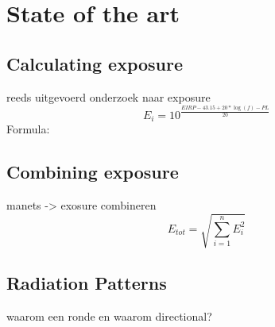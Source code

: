 \chapter{State of the art}
\label{sec:stateoftheart}
 
\section{Calculating exposure}
\label{sec:calculatingexposure}
reeds uitgevoerd onderzoek naar exposure
\begin{equation}
E_i = 10^{\frac{EIRP - 43.15 + 20*\log(f)- PL}{20}}

\end{equation}
Formula: \cite{J6_originalExposureFormula, J1}





\section{Combining exposure}
\label{sec:combiningexposure}
manets -> exosure combineren
\begin{equation}
E_{tot} = \sqrt{\sum_{i=1}^{n} E_i^2}
\end{equation}






\section{Radiation Patterns}
\label{sec:radiationpatterns}

waarom een ronde en waarom directional?